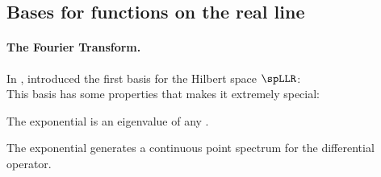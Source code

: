 \subsection{Bases for functions on the real line}
\paragraph{The Fourier Transform.}
In \citeyear{fourier1822}, \citeauthor{fourier1822} introduced the first basis for the Hilbert space $\spLLR$:
\\
This basis has some properties that makes it extremely special:
  \begin{liste}
    \item The exponential is an eigenvalue of any . %
    \item The exponential generates a continuous point spectrum for the differential operator.    %
  \end{liste}
